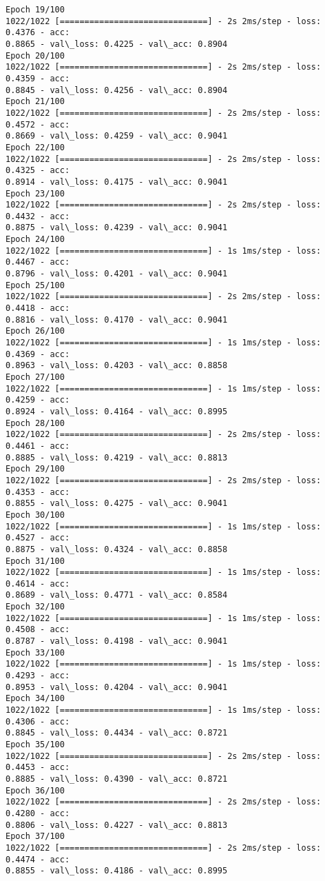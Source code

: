 \documentclass[11pt]{article}
\begin{document}
\begin{Verbatim}[commandchars=\\\{\}]
Epoch 19/100
1022/1022 [==============================] - 2s 2ms/step - loss: 0.4376 - acc:
0.8865 - val\_loss: 0.4225 - val\_acc: 0.8904
Epoch 20/100
1022/1022 [==============================] - 2s 2ms/step - loss: 0.4359 - acc:
0.8845 - val\_loss: 0.4256 - val\_acc: 0.8904
Epoch 21/100
1022/1022 [==============================] - 2s 2ms/step - loss: 0.4572 - acc:
0.8669 - val\_loss: 0.4259 - val\_acc: 0.9041
Epoch 22/100
1022/1022 [==============================] - 2s 2ms/step - loss: 0.4325 - acc:
0.8914 - val\_loss: 0.4175 - val\_acc: 0.9041
Epoch 23/100
1022/1022 [==============================] - 2s 2ms/step - loss: 0.4432 - acc:
0.8875 - val\_loss: 0.4239 - val\_acc: 0.9041
Epoch 24/100
1022/1022 [==============================] - 1s 1ms/step - loss: 0.4467 - acc:
0.8796 - val\_loss: 0.4201 - val\_acc: 0.9041
Epoch 25/100
1022/1022 [==============================] - 2s 2ms/step - loss: 0.4418 - acc:
0.8816 - val\_loss: 0.4170 - val\_acc: 0.9041
Epoch 26/100
1022/1022 [==============================] - 1s 1ms/step - loss: 0.4369 - acc:
0.8963 - val\_loss: 0.4203 - val\_acc: 0.8858
Epoch 27/100
1022/1022 [==============================] - 1s 1ms/step - loss: 0.4259 - acc:
0.8924 - val\_loss: 0.4164 - val\_acc: 0.8995
Epoch 28/100
1022/1022 [==============================] - 2s 2ms/step - loss: 0.4461 - acc:
0.8885 - val\_loss: 0.4219 - val\_acc: 0.8813
Epoch 29/100
1022/1022 [==============================] - 2s 2ms/step - loss: 0.4353 - acc:
0.8855 - val\_loss: 0.4275 - val\_acc: 0.9041
Epoch 30/100
1022/1022 [==============================] - 1s 1ms/step - loss: 0.4527 - acc:
0.8875 - val\_loss: 0.4324 - val\_acc: 0.8858
Epoch 31/100
1022/1022 [==============================] - 1s 1ms/step - loss: 0.4614 - acc:
0.8689 - val\_loss: 0.4771 - val\_acc: 0.8584
Epoch 32/100
1022/1022 [==============================] - 1s 1ms/step - loss: 0.4508 - acc:
0.8787 - val\_loss: 0.4198 - val\_acc: 0.9041
Epoch 33/100
1022/1022 [==============================] - 1s 1ms/step - loss: 0.4293 - acc:
0.8953 - val\_loss: 0.4204 - val\_acc: 0.9041
Epoch 34/100
1022/1022 [==============================] - 1s 1ms/step - loss: 0.4306 - acc:
0.8845 - val\_loss: 0.4434 - val\_acc: 0.8721
Epoch 35/100
1022/1022 [==============================] - 2s 2ms/step - loss: 0.4453 - acc:
0.8885 - val\_loss: 0.4390 - val\_acc: 0.8721
Epoch 36/100
1022/1022 [==============================] - 2s 2ms/step - loss: 0.4280 - acc:
0.8806 - val\_loss: 0.4227 - val\_acc: 0.8813
Epoch 37/100
1022/1022 [==============================] - 2s 2ms/step - loss: 0.4474 - acc:
0.8855 - val\_loss: 0.4186 - val\_acc: 0.8995

\end{Verbatim}
\end{document}
